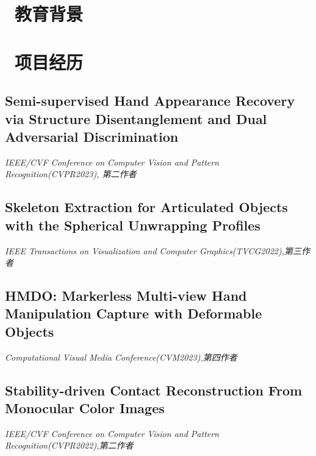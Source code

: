 \documentclass{resume}
\begin{document}



\section{\faGraduationCap\ 教育背景}
\vspace{2mm}

\section{\faUsers\ 项目经历}
\subsection{\textbf{Semi-supervised Hand Appearance Recovery via Structure Disentanglement and Dual Adversarial Discrimination}}
\textit{IEEE/CVF Conference on Computer Vision and Pattern Recognition(CVPR2023), 第二作者}

\subsection{\textbf{Skeleton Extraction for Articulated Objects with the Spherical Unwrapping Profiles}}
\textit{IEEE Transactions on Visualization and Computer Graphics(TVCG2022),第三作者}

\subsection{\textbf{HMDO: Markerless Multi-view Hand Manipulation Capture with Deformable Objects}}
\textit{Computational Visual Media Conference(CVM2023),第四作者}

\subsection{\textbf{Stability-driven Contact Reconstruction From Monocular Color Images}}
\textit{IEEE/CVF Conference on Computer Vision and Pattern Recognition(CVPR2022),第二作者}
\end{document}
